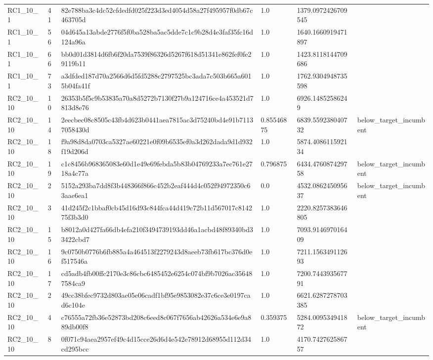 \begin{tabular}{llllll}
 RC1\_10\_1 & 41 & 82e788ba3c4dc52cfdedfd025f223d3ed4054d58a27f495957f0db67c463705d & 1.0 & 1379.0972426709545 &  \\
 RC1\_10\_1 & 56 & 04d645a13abde2776f5f0ba528ba5ac5dde7c1c9b28d4e3faf35fc16d124a96a & 1.0 & 1640.1660919471897 &  \\
 RC1\_10\_1 & 66 & bb0d01d3814d6fb6f20da7539f86326d5267f618d51341e862fef0fe29119b11 & 1.0 & 1423.8118144709686 &  \\
 RC1\_10\_1 & 73 & a3dfded187d70a2566d6d5fd5288c2797525bc3ada7c503b665a6015b04fa41f & 1.0 & 1762.9304948735598 &  \\
 RC2\_10\_10 & 10 & 26353b5f5c9b53835a70a8d5272b7130f27b9a124716ce4a453521d7813d8e76 & 1.0 & 6926.14852586249 &  \\
 RC2\_10\_10 & 14 & 2eecbec08c8505c43fb4d623b0441aea7815ac3d75240bd4e91b71137058430d & 0.85546875 & 6839.559238040732 & below\_target\_incumbent \\
 RC2\_10\_10 & 18 & f9a98d8da0703ca5327ae60221e0f09b6535ef0a3d262dada9d1d932f19d206d & 1.0 & 5874.408611592134 &  \\
 RC2\_10\_10 & 19 & c1c8456b968365083e60d1e49e69febda5b83b04769233a7ec761e2718a4c77a & 0.796875 & 6434.476087429758 & below\_target\_incumbent \\
 RC2\_10\_10 & 2 & 5152a293ba7dd8f3b448366f866c452b2eaf444d4c052f94972350c63aae6ea1 & 0.0 & 4532.086245095637 & below\_target\_incumbent \\
 RC2\_10\_10 & 3 & 41d245f2c1bbaf0cb45d16d93c844fca44d419c72b11d567017c814275f3b3d0 & 1.0 & 2220.8257383646805 &  \\
 RC2\_10\_10 & 15 & b8012a0d427fa66db4efa210f3494739193dd46a1acbd48f89340bd33422cbd7 & 1.0 & 7093.914697016409 &  \\
 RC2\_10\_10 & 16 & 9c0750b0776b6fb885a4a464513f2279243d8aeeb73fb617bc376d0ef517546a & 1.0 & 7211.156349112693 &  \\
 RC2\_10\_10 & 17 & cd5adb4fb00ffc2170e3c86cbc6485452e6254c074bf9b7026ac356487584ca9 & 1.0 & 7200.744393567791 &  \\
 RC2\_10\_10 & 2 & 49cc38bfec9732d803ae05e06cadf1bf95e9853082e37c6ce3e0197cad6c104e & 1.0 & 6621.6287278703385 &  \\
 RC2\_10\_10 & 4 & c76555a72fb36e52873bd208c6eed8c067f7656ab42626a534e6e9a889db00f8 & 0.359375 & 5284.009534941872 & below\_target\_incumbent \\
 RC2\_10\_10 & 8 & 0f071c94aea2957ef49c4d15cce26d6d4e542e78912d68955d112d34cd295bcc & 1.0 & 4170.742762586757 &  \\

\end{tabular}
